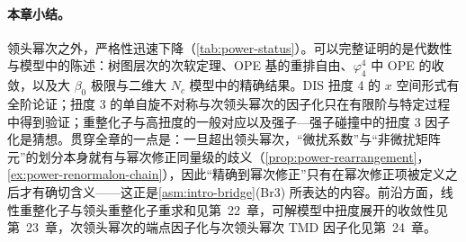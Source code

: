 \paragraph{本章小结。}
领头幂次之外，严格性迅速下降（\cref{tab:power-status}）。可以完整证明的是代数性与模型中的陈述：树图层次的次软定理、OPE 基的重排自由、$\varphi^4_4$ 中 OPE 的收敛，以及大 $\beta_0$ 极限与二维大 $N_c$ 模型中的精确结果。DIS 扭度 4 的 $x$ 空间形式有全阶论证；扭度 3 的单自旋不对称与次领头幂次的因子化只在有限阶与特定过程中得到验证；重整化子与高扭度的一般对应以及强子—强子碰撞中的扭度 3 因子化是猜想。贯穿全章的一点是：一旦超出领头幂次，“微扰系数”与“非微扰矩阵元”的划分本身就有与幂次修正同量级的歧义（\cref{prop:power-rearrangement}，\cref{ex:power-renormalon-chain}），因此“精确到幂次修正”只有在幂次修正项被定义之后才有确切含义——这正是\cref{asm:intro-bridge}(Br3) 所表达的内容。前沿方面，线性重整化子与领头重整化子重求和见第~22~章，可解模型中扭度展开的收敛性见第~23~章，次领头幂次的端点因子化与次领头幂次 TMD 因子化见第~24~章。
